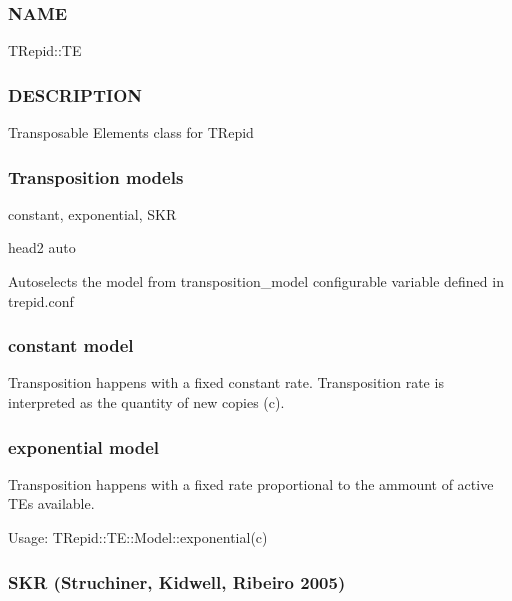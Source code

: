 \subsubsection*{NAME\label{NAME}}


TRepid::TE

\subsubsection*{DESCRIPTION\label{DESCRIPTION}}


Transposable Elements class for TRepid

\subsubsection*{Transposition models\label{Transposition_models}}


constant, exponential, SKR



head2 auto



Autoselects the model from transposition\_model configurable variable
defined in trepid.conf

\subsubsection*{constant model\label{constant_model}}


Transposition happens with a fixed constant rate. Transposition rate
is interpreted as the quantity of new copies (c).

\subsubsection*{exponential model\label{exponential_model}}


Transposition happens with a fixed rate proportional to the ammount of
active TEs available.



Usage:
TRepid::TE::Model::exponential(c)

\subsubsection*{SKR (Struchiner, Kidwell, Ribeiro 2005)\label{SKR_Struchiner_Kidwell_Ribeiro_2005_}}


